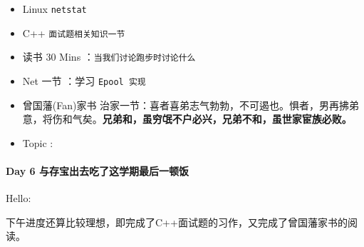 \documentclass[UTF8,a4paper,8pt]{ctexart}
\begin{document}
		 	\begin{itemize}[itemindent = 1em]
		 		\renewcommand\labelitemi{\makebox[0pt][l]{$\square$}\hspace{1em}} 
		 		\renewcommand\labelitemi{\makebox[0pt][l]{$\square$}\raisebox{.15ex}{\hspace{0.1em}$\checkmark$}}	 	
		 		\item   Linux \verb|netstat|
		 		\item   C++   \verb|面试题相关知识一节|
		 		
		 		\item   读书  30 Mins	：\verb|当我们讨论跑步时讨论什么|
		 		\item   Net 一节 ：学习 \verb|Epool 实现|	
		 		\renewcommand\labelitemi{\makebox[0pt][l]{$\square$}\hspace{1em}} 
		 		
		 		
		 		\renewcommand\labelitemi{\makebox[0pt][l]{$\square$}\raisebox{.15ex}{\hspace{0.1em}$\checkmark$}}
		 		\item   曾国藩(Fan)家书 治家一节：喜者喜弟志气勃勃，不可遏也。惧者，男再拂弟意，将伤和气矣。\textbf{兄弟和，虽穷氓不户必兴，兄弟不和，虽世家宦族必败。}
		 		\item   Topic :
		 	\end{itemize}
 	 \paragraph{Day 6    与存宝出去吃了这学期最后一顿饭    \quad     }
	 	 Hello:
	 	 
	 	 下午进度还算比较理想，即完成了C++面试题的习作，又完成了曾国藩家书的阅读。
	 	 
\end{document}

